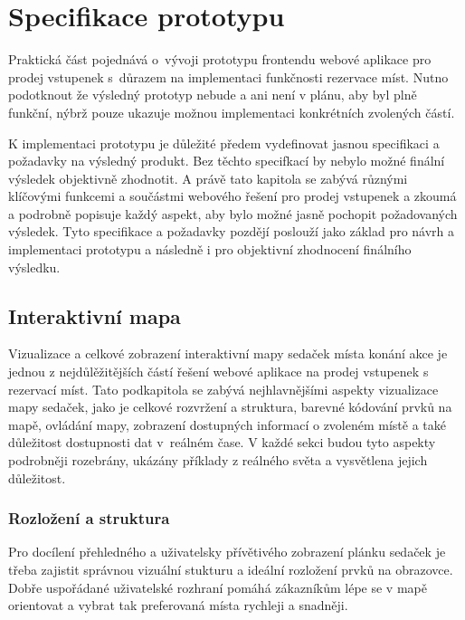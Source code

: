 \chapter{Specifikace prototypu}
\label{ch:specifikace}

Praktická část pojednává o~vývoji prototypu frontendu webové aplikace pro prodej vstupenek s~důrazem na implementaci funkčnosti rezervace míst.
Nutno podotknout že výsledný prototyp nebude a ani není v plánu, aby byl plně funkční, nýbrž pouze ukazuje možnou implementaci konkrétních zvolených částí.

K implementaci prototypu je důležité předem vydefinovat jasnou specifikaci a požadavky na výsledný produkt.
Bez těchto specifkací by nebylo možné finální výsledek objektivně zhodnotit.
A právě tato kapitola se zabývá různými klíčovými funkcemi a součástmi webového řešení pro prodej vstupenek a zkoumá a podrobně popisuje každý aspekt, aby bylo možné jasně pochopit požadovaných výsledek.
Tyto specifikace a požadavky pozdějí poslouží jako základ pro návrh a implementaci prototypu a následně i pro objektivní zhodnocení finálního výsledku.

\section{Interaktivní mapa}
\label{sec:specifikace-interaktivni-mapa}
Vizualizace a celkové zobrazení interaktivní mapy sedaček místa konání akce je jednou z nejdůlěžitějších částí řešení webové aplikace na prodej vstupenek s rezervací míst.
Tato podkapitola se zabývá nejhlavnějšími aspekty vizualizace mapy sedaček, jako je celkové rozvržení a struktura, barevné kódování prvků na mapě, ovládání mapy, zobrazení dostupných informací o zvoleném místě a také důležitost dostupnosti dat v~reálném čase.
V každé sekci budou tyto aspekty podrobněji rozebrány, ukázány příklady z reálného světa a vysvětlena jejich důležitost.

\subsection{Rozložení a struktura}
\label{sec:specifikace-interaktivni-mapa-rozlozeni-a-struktura}
Pro docílení přehledného a uživatelsky přívětivého zobrazení plánku sedaček je třeba zajistit správnou vizuální stukturu a ideální rozložení prvků na obrazovce.
Dobře uspořádané uživatelské rozhraní pomáhá zákazníkům lépe se v mapě orientovat a vybrat tak preferovaná místa rychleji a snadněji.

